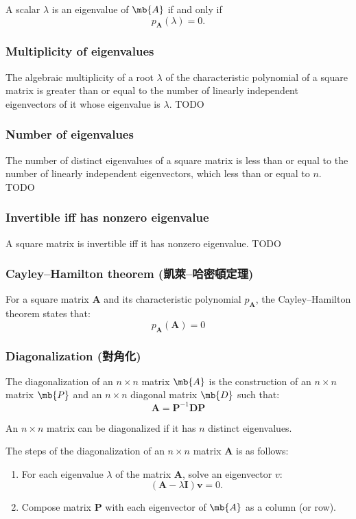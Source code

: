 \documentclass[a4paper,12pt]{report}
\begin{document}
A scalar $\lambda$ is an eigenvalue of $\mb{A}$ if and only if
\[p_\mathbf{A}(\lambda)=0.\]
\subsubsection{Multiplicity of eigenvalues}
The algebraic multiplicity of a root $\lambda$ of the characteristic polynomial of a square matrix is greater than or equal to the number of linearly independent eigenvectors of it whose eigenvalue is $\lambda$.
\bpr
TODO
\epr
\subsubsection{Number of eigenvalues}
The number of distinct eigenvalues of a square matrix is less than or equal to the number of linearly independent eigenvectors, which less than or equal to $n$.
\bpr
TODO
\epr
\subsubsection{Invertible iff has nonzero eigenvalue}
A square matrix is invertible iff it has nonzero eigenvalue.
\bpr
TODO
\epr
\subsubsection{Cayley–Hamilton theorem (凱萊–哈密頓定理)}
For a square matrix $\mathbf{A}$ and its characteristic polynomial $p_\mathbf{A}$, the Cayley–Hamilton theorem states that:
\[p_\mathbf{A}(\mathbf{A})=0\]
\subsubsection{Diagonalization (對角化)}
The diagonalization of an $n\times n$ matrix $\mb{A}$ is the construction of an $n\times n$ matrix $\mb{P}$ and an $n\times n$ diagonal matrix $\mb{D}$ such that:
\[\mathbf{A}=\mathbf{P}^{-1}\mathbf{D}\mathbf{P}\]

An $n\times n$ matrix can be diagonalized if it has $n$ distinct eigenvalues.

The steps of the diagonalization of an $n\times n$ matrix $\mathbf{A}$ is as follows:
\begin{enumerate}
\item For each eigenvalue $\lambda$ of the matrix $\mathbf{A}$, solve an eigenvector $v$:
\[(\mathbf{A} - \lambda \mathbf{I})\mathbf{v} = 0.\]
\item Compose matrix \( \mathbf{P} \) with each eigenvector of $\mb{A}$ as a column (or row).
\end{enumerate}
\end{document}
